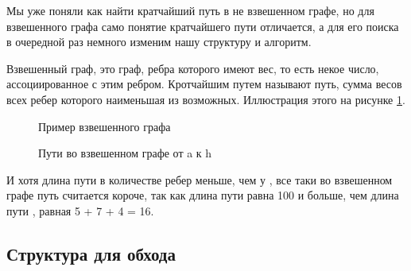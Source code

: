 \documentclass[../article.tex]{subfiles}
\begin{document}
{Мы уже поняли как найти кратчайший путь в не взвешенном графе, но для взвешенного графа само понятие кратчайшего пути отличается, а для его поиска в очередной раз немного изменим нашу структуру и алгоритм.}

Взвешенный граф, это граф, ребра которого имеют вес, то есть некое число, ассоциированное с этим ребром. Кротчайшим путем называют путь, сумма весов всех ребер которого наименьшая из возможных. Иллюстрация этого на рисунке \ref{fig:compareWeightedPaths}.

\begin{figure}
    \caption{Пример взвешенного графа}
\end{figure}

\begin{figure}
    \caption{Пути во взвешенном графе от {\firacodebold a} к {\firacodebold h}}
    \label{fig:compareWeightedPaths}
\end{figure}


И хотя длина пути {\firacodebold [a, h]} в количестве ребер меньше, чем у {\firacodebold [a, f, g, h]}, все таки во взвешенном графе путь {\firacodebold [a, f, g, h]} считается короче, так как длина пути {\firacodebold [a, h]} равна 100 и больше, чем длина пути {\firacodebold [a, f, g, h]}, равная 5 + 7 + 4 = 16.

\subsection{Структура для обхода}
\end{document}
